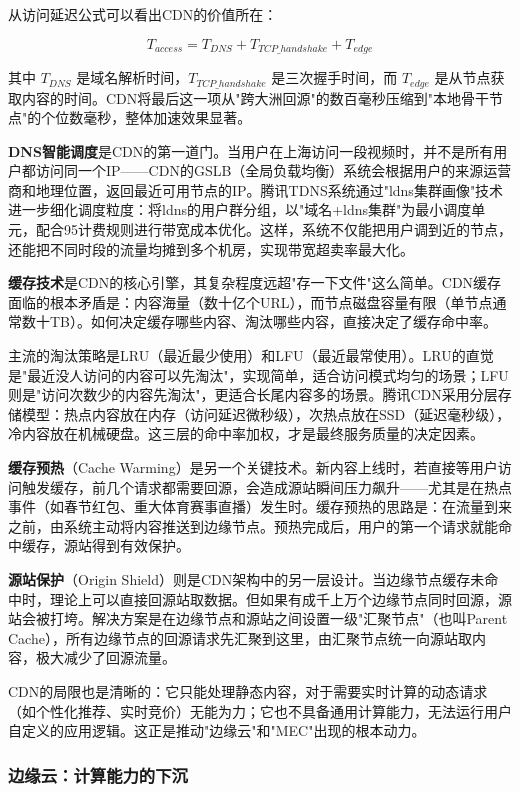 从访问延迟公式可以看出CDN的价值所在：

\begin{equation}
T_{access} = T_{DNS} + T_{TCP\_handshake} + T_{edge}
\end{equation}

其中 $T_{DNS}$ 是域名解析时间，$T_{TCP\_handshake}$ 是三次握手时间，而 $T_{edge}$ 是从节点获取内容的时间。CDN将最后这一项从"跨大洲回源"的数百毫秒压缩到"本地骨干节点"的个位数毫秒，整体加速效果显著。

\textbf{DNS智能调度}是CDN的第一道门。当用户在上海访问一段视频时，并不是所有用户都访问同一个IP——CDN的GSLB（全局负载均衡）系统会根据用户的来源运营商和地理位置，返回最近可用节点的IP。腾讯TDNS系统通过"ldns集群画像"技术进一步细化调度粒度：将ldns的用户群分组，以"域名+ldns集群"为最小调度单元，配合95计费规则进行带宽成本优化。这样，系统不仅能把用户调到近的节点，还能把不同时段的流量均摊到多个机房，实现带宽超卖率最大化。

\textbf{缓存技术}是CDN的核心引擎，其复杂程度远超"存一下文件"这么简单。CDN缓存面临的根本矛盾是：内容海量（数十亿个URL），而节点磁盘容量有限（单节点通常数十TB）。如何决定缓存哪些内容、淘汰哪些内容，直接决定了缓存命中率。

主流的淘汰策略是LRU（最近最少使用）和LFU（最近最常使用）。LRU的直觉是"最近没人访问的内容可以先淘汰"，实现简单，适合访问模式均匀的场景；LFU则是"访问次数少的内容先淘汰"，更适合长尾内容多的场景。腾讯CDN采用分层存储模型：热点内容放在内存（访问延迟微秒级），次热点放在SSD（延迟毫秒级），冷内容放在机械硬盘。这三层的命中率加权，才是最终服务质量的决定因素。

\textbf{缓存预热}（Cache Warming）是另一个关键技术。新内容上线时，若直接等用户访问触发缓存，前几个请求都需要回源，会造成源站瞬间压力飙升——尤其是在热点事件（如春节红包、重大体育赛事直播）发生时。缓存预热的思路是：在流量到来之前，由系统主动将内容推送到边缘节点。预热完成后，用户的第一个请求就能命中缓存，源站得到有效保护。

\textbf{源站保护}（Origin Shield）则是CDN架构中的另一层设计。当边缘节点缓存未命中时，理论上可以直接回源站取数据。但如果有成千上万个边缘节点同时回源，源站会被打垮。解决方案是在边缘节点和源站之间设置一级"汇聚节点"（也叫Parent Cache），所有边缘节点的回源请求先汇聚到这里，由汇聚节点统一向源站取内容，极大减少了回源流量。

CDN的局限也是清晰的：它只能处理静态内容，对于需要实时计算的动态请求（如个性化推荐、实时竞价）无能为力；它也不具备通用计算能力，无法运行用户自定义的应用逻辑。这正是推动"边缘云"和"MEC"出现的根本动力。

\subsubsection{边缘云：计算能力的下沉}


